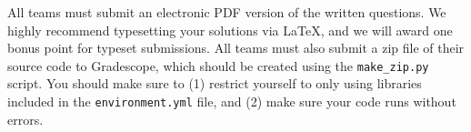 All teams must submit an electronic PDF version of the written questions. We
highly recommend typesetting your solutions via \LaTeX, and we will award one bonus point for typeset submissions. 
All teams must also submit a zip file of
their source code to Gradescope, which should be created using the
\texttt{make\_zip.py} script. You
should make sure to (1) restrict yourself to only using libraries included in
the
\texttt{environment.yml} file, and (2) make sure your code runs without errors.



